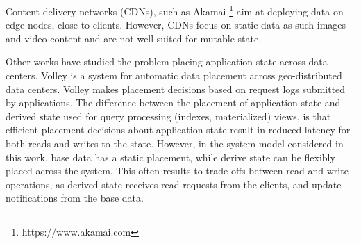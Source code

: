 Content delivery networks (CDNs), such as Akamai \footnote{https://www.akamai.com} aim at deploying data on edge nodes,
close to clients.
However, CDNs focus on static data as such images and video content and are not well suited for mutable state.

Other works have studied the problem placing application state across data centers.
Volley \cite{agarwal:volley} is a system for automatic data placement across geo-distributed data centers.
Volley makes placement decisions based on request logs submitted by applications.
The difference between the placement of application state and derived state used for query processing (indexes, materialized)
views, is that efficient placement decisions about application state result in reduced latency for both reads and writes
to the state.
However, in the system model considered in this work, base data has a static placement,
while derive state can be flexibly placed across the system.
This often results to trade-offs between read and write operations,
as derived state receives read requests from the clients, and update notifications from the base data.




